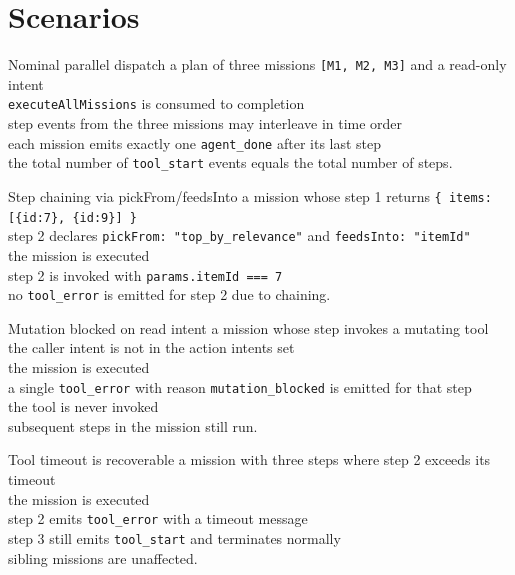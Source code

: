 \section{Scenarios}

\begin{scenario}{Nominal parallel dispatch}
\Given a plan of three missions \texttt{[M1, M2, M3]} and a read-only intent \\
\When \texttt{executeAllMissions} is consumed to completion \\
\Then step events from the three missions may interleave in time order \\
\And each mission emits exactly one \texttt{agent\_done} after its last step \\
\And the total number of \texttt{tool\_start} events equals the total number of steps.
\end{scenario}

\begin{scenario}{Step chaining via pickFrom/feedsInto}
\Given a mission whose step 1 returns \verb|{ items: [{id:7}, {id:9}] }| \\
\And step 2 declares \texttt{pickFrom: "top\_by\_relevance"} and \texttt{feedsInto: "itemId"} \\
\When the mission is executed \\
\Then step 2 is invoked with \texttt{params.itemId === 7} \\
\And no \texttt{tool\_error} is emitted for step 2 due to chaining.
\end{scenario}

\begin{scenario}{Mutation blocked on read intent}
\Given a mission whose step invokes a mutating tool \\
\And the caller intent is not in the action intents set \\
\When the mission is executed \\
\Then a single \texttt{tool\_error} with reason \texttt{mutation\_blocked} is emitted for that step \\
\And the tool is never invoked \\
\And subsequent steps in the mission still run.
\end{scenario}

\begin{scenario}{Tool timeout is recoverable}
\Given a mission with three steps where step 2 exceeds its timeout \\
\When the mission is executed \\
\Then step 2 emits \texttt{tool\_error} with a timeout message \\
\And step 3 still emits \texttt{tool\_start} and terminates normally \\
\And sibling missions are unaffected.
\end{scenario}

